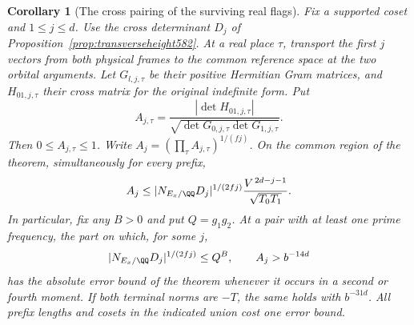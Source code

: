 \documentclass[a4paper,11pt]{article}
\newtheorem{corollary}[proposition]{Corollary}
\theoremstyle{definition}
\theoremstyle{remark}
\numberwithin{equation}{section}
\begin{document}
\begin{corollary}[The cross pairing of the surviving real flags]
\leavevmode\label{cor:crossangles664}
Fix a supported coset and \(1\le j\le d\). Use the cross
determinant \(D_j\) of Proposition~\ref{prop:transverseheight582}.
At a real place \(\tau\), transport the first \(j\) vectors from
both physical frames to the common reference space at the two
orbital arguments. Let \(G_{l,j,\tau}\) be their positive
Hermitian Gram matrices, and \(H_{01,j,\tau}\) their cross matrix
for the original indefinite form. Put
\[
 A_{j,\tau}=
 \frac{|\det H_{01,j,\tau}|}
 {\sqrt{\det G_{0,j,\tau}\det G_{1,j,\tau}}}.
\]
Then \(0\le A_{j,\tau}\le1\). Write
\(A_j=(\prod_{\tau}A_{j,\tau})^{1/(fj)}\). On the common region
of the theorem, simultaneously for every prefix,
\[
    A_j \le
       |N_{E_x/\QQ}D_j|^{1/(2fj)}
               \frac{V^{\,2d-j-1}}{\sqrt{T_0T_1}} .
\]
In particular, fix any \(B>0\) and put \(Q=g_1g_2\). At a pair
with at least one prime frequency, the part on which, for some \(j\),
\[
       |N_{E_x/\QQ}D_j|^{1/(2fj)}\le Q^B,\qquad A_j>b^{-14d}
\]
has the absolute error bound of the theorem whenever it occurs
in a second or fourth moment. If both terminal norms are
\(-T\), the same holds with \(b^{-31d}\). All prefix lengths
and cosets in the indicated union cost one error bound.
\end{corollary}
\end{document}
